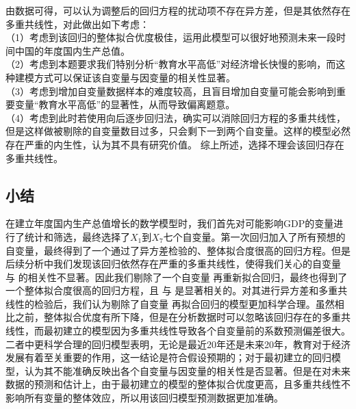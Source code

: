 \documentclass[UTF8]{article}
\begin{document}
\newpage
	由数据可得，可以认为调整后的回归方程的扰动项不存在异方差，但是其依然存在多重共线性，对此做出如下考虑：
	\\（1）考虑到该回归的整体拟合优度极佳，运用此模型可以很好地预测未来一段时间中国的年度国内生产总值。
	\\（2）考虑到本题要求我们特别分析“教育水平高低”对经济增长快慢的影响，而这种建模方式可以保证该自变量与因变量的相关性显著。
	\\（3）考虑到增加自变量数据样本的难度较高，且盲目增加自变量可能会影响到重要变量“教育水平高低”的显著性，从而导致偏离题意。
	\\（4）考虑到此时若使用向后逐步回归法，确实可以消除回归方程的多重共线性，但是这样做被剔除的自变量数目过多，只会剩下一到两个自变量。这样的模型必然存在严重的内生性，认为其不具有研究价值。
	综上所述，选择不理会该回归存在多重共线性。
	\subsection{小结}
	在建立年度国内生产总值增长的数学模型时，我们首先对可能影响GDP的变量进行了统计和筛选，最终选择了$X_1$到$X_7$七个自变量。第一次回归加入了所有预想的自变量，最终得到了一个通过了异方差检验的、整体拟合度很高的回归方程。但是后续分析中我们发现该回归依然存在严重的多重共线性，使得我们关心的自变量 与 的相关性不显著。因此我们剔除了一个自变量 再重新拟合回归，最终也得到了一个整体拟合度很高的回归方程，且 与 是显著相关的。对其进行异方差和多重共线性的检验后，我们认为剔除了自变量 再拟合回归的模型更加科学合理。虽然相比之前，整体拟合优度有所下降，但是在分析数据时可以忽略该回归存在的多重共线性，而最初建立的模型因为多重共线性导致各个自变量前的系数预测偏差很大。
	\\\indent
	二者中更科学合理的回归模型表明，无论是最近20年还是未来20年，教育对于经济发展有着至关重要的作用，这一结论是符合假设预期的；对于最初建立的回归模型，认为其不能准确反映出各个自变量与因变量的相关性是否显著。但是在对未来数据的预测和估计上，由于最初建立的模型的整体拟合优度更高，且多重共线性不影响所有变量的整体效应，所以用该回归模型预测数据更加准确。
\end{document}
